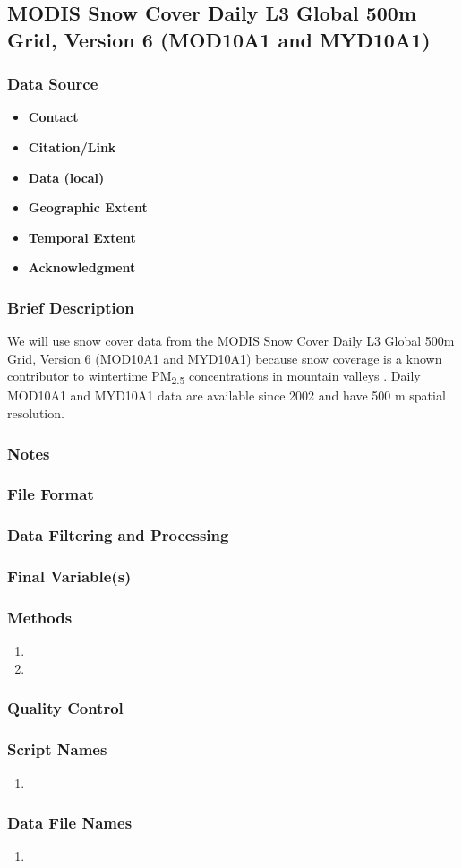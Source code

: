 \subsection{MODIS Snow Cover Daily L3 Global 500m Grid, Version 6 (MOD10A1 and MYD10A1)}
\subsubsection*{Data Source}
\begin{itemize}[nolistsep]
\item \textbf{Contact}
\item \textbf{Citation/Link}
\item \textbf{Data (local)}
\item \textbf{Geographic Extent}
\item \textbf{Temporal Extent}
\item \textbf{Acknowledgment}
\end{itemize}
\subsubsection*{Brief Description}

We will use snow cover data from the MODIS Snow Cover Daily L3 Global 500m Grid, Version 6 (MOD10A1 and MYD10A1) \citep{Hall2016} because snow coverage is a known contributor to wintertime PM\textsubscript{2.5} concentrations in mountain valleys \citep{Whiteman2014}. Daily MOD10A1 and MYD10A1 data are available since 2002 and have 500 m spatial resolution. 

\subsubsection*{Notes}
\subsubsection*{File Format}
\subsubsection*{Data Filtering and Processing}
\subsubsection*{Final Variable(s)}
\subsubsection*{Methods}
\begin{enumerate}
\item 
\item
\end{enumerate}
\subsubsection*{Quality Control}
\subsubsection*{Script Names}
\begin{enumerate}
\item 
\end{enumerate}
\subsubsection*{Data File Names}
\begin{enumerate}
\item 
\end{enumerate}